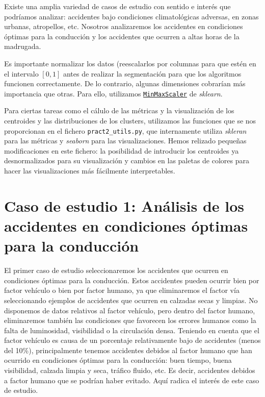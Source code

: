 \documentclass[oneside]{book}
\begin{document}
  Existe una amplia variedad de casos de estudio con sentido e interés
  que podríamos analizar: accidentes bajo condiciones climatológicas
  adversas, en zonas urbanas, atropellos, etc. Nosotros analizaremos
  los accidentes en condiciones óptimas para la conducción y los
  accidentes que ocurren a altas horas de la madrugada.

  Es importante normalizar los datos (reescalarlos por columnas para
  que estén en el intervalo $[0,1]$ antes de realizar la segmentación
  para que los algoritmos funcionen correctamente. De lo contrario,
  algunas dimensiones cobrarían más importancia que otras. Para ello,
  utilizamos
  \href{https://scikit-learn.org/stable/modules/generated/sklearn.preprocessing.MinMaxScaler.html}{\texttt{MinMaxScaler}}
  de \textit{sklearn}.

  Para ciertas tareas como el cálulo de las métricas y la
  visualización de los centroides y las distribuciones de los
  clusters, utilizamos las funciones que se nos proporcionan en el
  fichero \texttt{pract2\_utils.py}, que internamente utiliza
  \textit{skleran} para las métricas y \textit{seaborn} para las
  visualizaciones. Hemos relizado pequeñas modificaciones en este
  fichero: la posibilidad de introducir los centroides ya
  desnormalizados para su visualización y cambios en las paletas de
  colores para hacer las visualizaciones más fácilmente interpretables.
  
\section{Caso de estudio 1: Análisis de los accidentes en condiciones óptimas para la conducción}

El primer caso de estudio seleccionaremos los accidentes que ocurren
en condiciones óptimas para la conducción. Estos accidentes pueden
ocurrir bien por factor vehículo o bien por factor humano, ya que
eliminaremos el factor vía seleccionando ejemplos de accidentes que
ocurren en calzadas secas y limpias. No disponemos de datos relativos
al factor vehículo, pero dentro del factor humano, eliminaremos
también las condiciones que favorecen los errores humanos como la
falta de luminosidad, visibilidad o la circulación densa. Teniendo en
cuenta que el factor vehículo es causa de un porcentaje relativamente
bajo de accidentes (menos del 10\%), principalmente tenemos accidentes
debidos al factor humano que han ocurrido en condiciones óptimas para
la conducción: buen tiempo, buena visibilidad, calzada limpia y seca,
tráfico fluido, etc. Es decir, accidentes debidos a factor humano que
se podrían haber evitado. Aquí radica el interés de este caso de
estudio.
\end{document}
